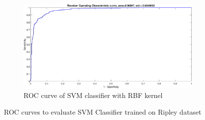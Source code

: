 \documentclass[12pt]{report}
\begin{document}
{\begin{figure}[!ht]
\begin{subfigure}{.35\textwidth}
		\includegraphics[height=.65\linewidth, width=0.9\linewidth]{ripley/ripley_RBF_ROC.eps}
		\caption{ROC curve of SVM classifier with RBF kernel} 
		\label{fig:ripley_RBF_ROC}
	\end{subfigure}
	\caption{ROC curves to evaluate SVM Classifier trained on Ripley dataset}
	\label{fig:ripley_ROC}
\end{figure}

}
\end{document}
